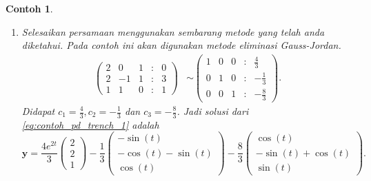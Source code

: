 \documentclass[a4paper]{article}
\theoremstyle{definisi}
\newtheorem{contoh}{Contoh}[subsection]
\numberwithin{equation}{section}
\begin{document}
\begin{contoh}
\begin{enumerate}[label=Langkah \arabic*: ,leftmargin=*]
\begin{align*}
        \begin{pmatrix}0\\3\\1\end{pmatrix} &= c_1\begin{pmatrix}2\\2\\1\end{pmatrix} + c_2\begin{pmatrix}0\\-1\\1\end{pmatrix} + c_3\begin{pmatrix}1\\1\\0\end{pmatrix}= \begin{pmatrix}2c_1+c_3\\2c_1-c_2+c_3\\c_1+c_2\end{pmatrix}.
      \end{align*}
      \item Selesaikan persamaan menggunakan sembarang metode yang telah anda diketahui. Pada contoh ini akan digunakan metode eliminasi Gauss-Jordan. 
      \begin{align*}
        \begin{pmatrix}
          2 & 0 & 1 &:& 0\\
          2 & -1 & 1 &:& 3\\
          1 & 1 & 0 &:& 1
        \end{pmatrix}
        &\sim \begin{pmatrix}
          1 & 0 & 0 &:& \frac{4}{3}\\
          0 & 1 & 0 &:& -\frac{1}{3}\\
          0 & 0 & 1 &:& -\frac{8}{3}
        \end{pmatrix}.
      \end{align*}
      Didapat $c_1 = \frac{4}{3}, c_2 = -\frac{1}{3}$ dan $c_3 = -\frac{8}{3}$. Jadi solusi dari \eqref{eq:contoh_pd_trench_1} adalah
      \[\mathbf{y} = \frac{4e^{2t}}{3}\begin{pmatrix}2\\2\\1\end{pmatrix} - \frac{1}{3}\begin{pmatrix}-\sin(t)\\-\cos(t)-\sin(t)\\\cos(t)\end{pmatrix} - \frac{8}{3}\begin{pmatrix}\cos(t)\\-\sin(t)+\cos(t)\\\sin(t)\end{pmatrix}.\]
    \end{enumerate}
  \end{contoh}
\end{document}
